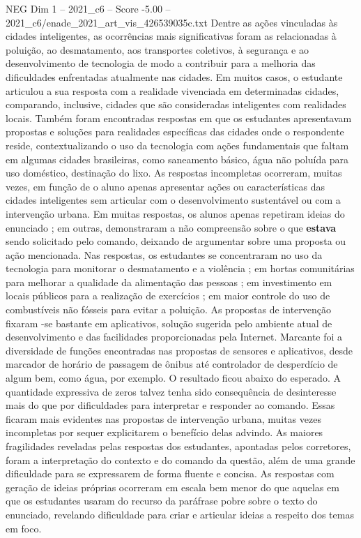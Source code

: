 \begin{textsample}{NEG Dim 1 – 2021\_c6 – Score -5.00 – 2021\_c6/enade\_2021\_art\_vis\_426539035c.txt}
Dentre as ações vinculadas às cidades inteligentes, as ocorrências mais significativas foram as relacionadas à poluição, ao desmatamento, aos transportes coletivos, à segurança e ao desenvolvimento de tecnologia de modo a contribuir para a melhoria das dificuldades enfrentadas atualmente nas cidades.
Em muitos casos, o estudante articulou a sua resposta com a realidade vivenciada em determinadas cidades, comparando, inclusive, cidades que são consideradas inteligentes com realidades locais.
Também foram encontradas respostas em que os estudantes apresentavam propostas e soluções para realidades específicas das cidades onde o respondente reside, contextualizando o uso da tecnologia com ações fundamentais que faltam em algumas cidades brasileiras, como saneamento básico, água não poluída para uso doméstico, destinação do lixo.
As respostas incompletas ocorreram, muitas vezes, em função de o aluno apenas apresentar ações ou características das cidades inteligentes sem articular com o desenvolvimento sustentável ou com a intervenção urbana.
Em muitas respostas, os alunos apenas repetiram ideias do enunciado ; em outras, demonstraram a não compreensão sobre o que \textbf{estava} sendo solicitado pelo comando, deixando de argumentar sobre uma proposta ou ação mencionada.
Nas respostas, os estudantes se concentraram no uso da tecnologia para monitorar o desmatamento e a violência ; em hortas comunitárias para melhorar a qualidade da alimentação das pessoas ; em investimento em locais públicos para a realização de exercícios ; em maior controle do uso de combustíveis não fósseis para evitar a poluição.
As propostas de intervenção fixaram -se bastante em aplicativos, solução sugerida pelo ambiente atual de desenvolvimento e das facilidades proporcionadas pela Internet.
Marcante foi a diversidade de funções encontradas nas propostas de sensores e aplicativos, desde marcador de horário de passagem de ônibus até controlador de desperdício de algum bem, como água, por exemplo.
O resultado ficou abaixo do esperado.
A quantidade expressiva de zeros talvez tenha sido consequência de desinteresse mais do que por dificuldades para interpretar e responder ao comando.
Essas ficaram mais evidentes nas propostas de intervenção urbana, muitas vezes incompletas por sequer explicitarem o benefício delas advindo.
As maiores fragilidades reveladas pelas respostas dos estudantes, apontadas pelos corretores, foram a interpretação do contexto e do comando da questão, além de uma grande dificuldade para se expressarem de forma fluente e concisa.
As respostas com geração de ideias próprias ocorreram em escala bem menor do que aquelas em que os estudantes usaram do recurso da paráfrase pobre sobre o texto do enunciado, revelando dificuldade para criar e articular ideias a respeito dos temas em foco.

\end{textsample}
